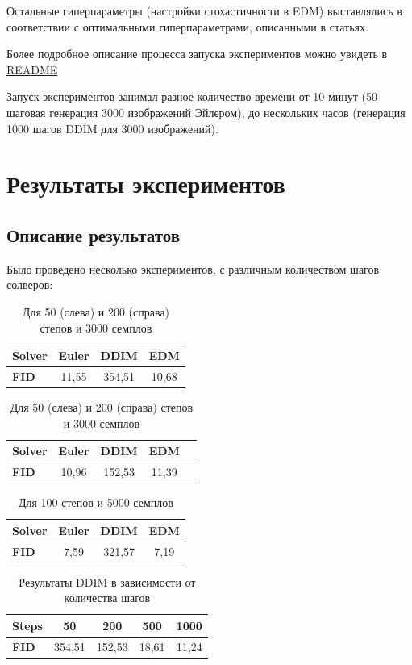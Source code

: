 \documentclass[a4paper]{article}
\begin{document}
    Остальные гиперпараметры (настройки стохастичности в EDM) выставлялись в соответствии с оптимальными гиперпараметрами, описанными в статьях.
    
    \par Более подробное описание процесса запуска экспериментов можно увидеть в
    \href{https://github.com/ARS404/DiffusionProject}{README}

    Запуск экспериментов занимал разное количество времени от 10 минут (50-шаговая генерация 3000 изображений Эйлером), до нескольких часов (генерация 1000 шагов DDIM для 3000 изображений).


    \section{Результаты экспериментов}
    \subsection{Описание результатов}
    
    Было проведено несколько экспериментов, с различным количеством шагов солверов:
    \begin{table}
        \centering
        \begin{tabular}{ l | c | c | c }
            \textbf{Solver} & Euler & DDIM  & EDM \\ \hline
            \textbf{FID}    & 11{,}55 & 354{,}51 & 10{,}68
        \end{tabular}\hspace{50pt}%
        \begin{tabular}{ l | c | c | c | c }
            \textbf{Solver} & Euler & DDIM  & EDM \\ \hline
            \textbf{FID}    & 10{,}96 & 152{,}53 & 11{,}39
        \end{tabular}
        \caption{Для 50 (слева) и 200 (справа) степов и 3000 семплов}
        \label{tab:tab1}
    \end{table}
    \begin{table}
        \centering
        \begin{tabular}{ l | c | c | c }
            \textbf{Solver} & Euler & DDIM  & EDM \\ \hline
            \textbf{FID}    & 7{,}59 & 321{,}57 & 7{,}19 
        \end{tabular}
        \caption{Для 100 степов и 5000 семплов}
        \label{tab:tab2}
    \end{table}
    \begin{table}
        \centering
        \begin{tabular}{ l | c | c | c | c }
            \textbf{Steps} & 50 & 200 & 500 & 1000 \\ \hline
            \textbf{FID}   & 354{,}51 & 152{,}53 & 18{,}61 & 11{,}24
        \end{tabular}
        \caption{Результаты DDIM в зависимости от количества шагов}
        \label{tab:tab3}
    \end{table}
\end{document}
